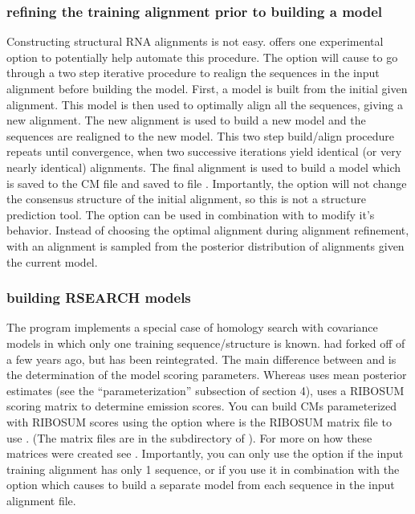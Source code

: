 \subsubsection{refining the training alignment prior to building a model}
Constructing structural RNA alignments is not easy. 
offers one experimental option to potentially help automate this
procedure. The  option will cause  to
go through a two step iterative procedure to realign the sequences in
the input alignment before building the model. First, a model is built
from the initial given alignment. This model is then used to optimally
align all the sequences, giving a new alignment. The new alignment is
used to build a new model and the sequences are realigned to the new
model. This two step build/align procedure repeats until convergence,
when two successive iterations yield identical (or very nearly
identical) alignments. The final alignment is used to build a model
which is saved to the CM file and saved to file
. Importantly, the  option will not change
the consensus structure of the initial alignment, so this is not a
structure prediction tool. The  option can be used in
combination with  to modify it's behavior. Instead of
choosing the optimal alignment during alignment refinement, with
 an alignment is sampled from the posterior distribution
of alignments given the current model.

\subsubsection{building RSEARCH models}
The  program \cite{KleinEddy03} implements a special case of
homology search with covariance models in which only one training
sequence/structure is known.  had forked off of
 a few years ago, but has been reintegrated.
The main difference between 
and  is the determination of the model scoring
parameters. Whereas  uses mean posterior estimates
(see the ``parameterization'' subsection of section 4),
 uses a RIBOSUM scoring matrix to determine
emission scores. You can build CMs parameterized with
RIBOSUM scores using the  option where 
is the RIBOSUM matrix file to use . (The matrix files are in the
 subdirectory of ). For more on how
these matrices were created see \cite{KleinEddy03}. Importantly, you
can only use the  option if the input training
alignment has only 1 sequence, or if you use it in combination with
the  option which causes  to build a
separate model from each sequence in the input alignment file.

